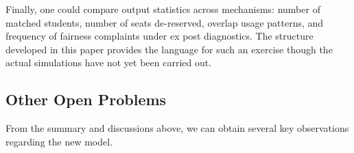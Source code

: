 \documentclass[12pt]{article}
\newcommand{\1}{\mathbf{1}}
\begin{document}
Finally, one could compare output statistics across mechanisms: number of matched students, number of seats de-reserved, overlap usage patterns, and frequency of fairness complaints under ex post diagnostics. The structure developed in this paper provides the language for such an exercise though the actual simulations have not yet been carried out.





\subsection{Other Open Problems}
From the summary and discussions above, we can obtain several key observations regarding the new model.
\end{document}
